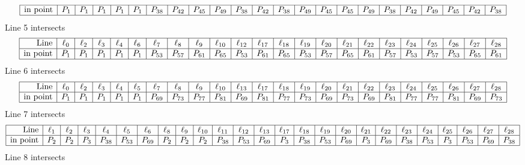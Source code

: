 \documentclass{article}
\begin{document}
{$$\begin{array}{|r*{22}{|c}|}
\hline
\mbox{in point}  & P_{1} & P_{1} & P_{1} & P_{1} & P_{1} & P_{38} & P_{42} & P_{45} & P_{49} & P_{38} & P_{42} & P_{38} & P_{49} & P_{45} & P_{45} & P_{49} & P_{38} & P_{42} & P_{49} & P_{45} & P_{42} & P_{38}\\
\hline
\end{array}
$$
Line 5 intersects 
$$
\begin{array}{|r*{22}{|c}|}
\hline
\mbox{Line}  & \ell_{0} & \ell_{2} & \ell_{3} & \ell_{4} & \ell_{6} & \ell_{7} & \ell_{8} & \ell_{9} & \ell_{10} & \ell_{12} & \ell_{17} & \ell_{18} & \ell_{19} & \ell_{20} & \ell_{21} & \ell_{22} & \ell_{23} & \ell_{24} & \ell_{25} & \ell_{26} & \ell_{27} & \ell_{28}\\
\hline
\mbox{in point}  & P_{1} & P_{1} & P_{1} & P_{1} & P_{1} & P_{53} & P_{57} & P_{61} & P_{65} & P_{53} & P_{61} & P_{65} & P_{53} & P_{57} & P_{65} & P_{61} & P_{57} & P_{53} & P_{57} & P_{53} & P_{65} & P_{61}\\
\hline
\end{array}
$$
Line 6 intersects 
$$
\begin{array}{|r*{22}{|c}|}
\hline
\mbox{Line}  & \ell_{0} & \ell_{2} & \ell_{3} & \ell_{4} & \ell_{5} & \ell_{7} & \ell_{8} & \ell_{9} & \ell_{10} & \ell_{13} & \ell_{17} & \ell_{18} & \ell_{19} & \ell_{20} & \ell_{21} & \ell_{22} & \ell_{23} & \ell_{24} & \ell_{25} & \ell_{26} & \ell_{27} & \ell_{28}\\
\hline
\mbox{in point}  & P_{1} & P_{1} & P_{1} & P_{1} & P_{1} & P_{69} & P_{73} & P_{77} & P_{81} & P_{69} & P_{81} & P_{77} & P_{73} & P_{69} & P_{73} & P_{69} & P_{81} & P_{77} & P_{77} & P_{81} & P_{69} & P_{73}\\
\hline
\end{array}
$$
Line 7 intersects 
$$
\begin{array}{|r*{24}{|c}|}
\hline
\mbox{Line}  & \ell_{1} & \ell_{2} & \ell_{3} & \ell_{4} & \ell_{5} & \ell_{6} & \ell_{8} & \ell_{9} & \ell_{10} & \ell_{11} & \ell_{12} & \ell_{13} & \ell_{17} & \ell_{18} & \ell_{19} & \ell_{20} & \ell_{21} & \ell_{22} & \ell_{23} & \ell_{24} & \ell_{25} & \ell_{26} & \ell_{27} & \ell_{28}\\
\hline
\mbox{in point}  & P_{2} & P_{2} & P_{3} & P_{38} & P_{53} & P_{69} & P_{2} & P_{2} & P_{2} & P_{38} & P_{53} & P_{69} & P_{3} & P_{38} & P_{53} & P_{69} & P_{3} & P_{69} & P_{38} & P_{53} & P_{3} & P_{53} & P_{69} & P_{38}\\
\hline
\end{array}
$$
Line 8 intersects 
$$
\begin{array}{|r*{22}{|c}|}

\end{array}$$}
\end{document}
